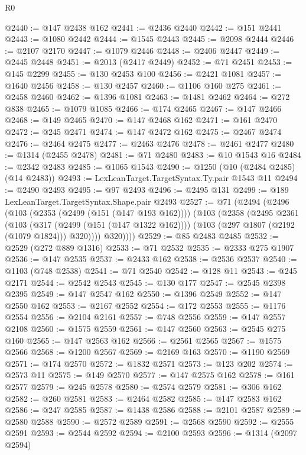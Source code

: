 \begin{lexlean}{R0}
\begin{coremodule}
@2440 := @147 @2438 @162
@2441 := @2436 @2440
@2442 := @151 @2441
@2443 := @1080 @2442
@2444 := @1545 @2443
@2445 := @2098 @2444
@2446 := @2107 @2170
@2447 := @1079 @2446
@2448 := @2406 @2447
@2449 := @2445 @2448
@2451 := @2013 (@2417 @2449)
@2452 := @71 @2451
@2453 := @145 @2299
@2455 := @130 @2453 @100
@2456 := @2421 @1081
@2457 := @1640 @2456
@2458 := @130 @2457
@2460 := @1106 @160 @275
@2461 := @2458 @2460
@2462 := @1396 @1081
@2463 := @1481 @2462
@2464 := @272 @838
@2465 := @1079 @1085
@2466 := @174 @2465
@2467 := @147 @2466
@2468 := @149 @2465
@2470 := @147 @2468 @162
@2471 := @161 @2470
@2472 := @245 @2471
@2474 := @147 @2472 @162
@2475 := @2467 @2474
@2476 := @2464 @2475
@2477 := @2463 @2476
@2478 := @2461 @2477
@2480 := @1314 (@2455 @2478)
@2481 := @71 @2480
@2483 := @10 @1543 @16
@2484 := @2342 @2483
@2485 := @1065 @1543
@2490 := @1250 (@10 (@2484 @2485) (@14 @2483))
@2493 := LexLeanTarget.TargetSyntax.Ty.pair @1543 @11
@2494 := @2490 @2493
@2495 := @97 @2493
@2496 := @2495 @131
@2499 := @189 LexLeanTarget.TargetSyntax.Shape.pair @2493
@2527 := @71
    (@2494
      (@2496
        (@103
          (@2353 (@2499 (@151 (@147 @193 @162))))
          (@103
            (@2358
              (@2495
                @2361
                (@103
                  (@317 (@2499 (@151 (@147 @1322 @162))))
                  (@103 (@297 @1807 (@2192 (@1079 @1824))) @320))))
            @320))))
@2529 := @85 @2483 @2485
@2532 := @2529 (@272 @889 @1316)
@2533 := @71 @2532
@2535 := @2333 @275 @1907
@2536 := @147 @2535
@2537 := @2433 @162
@2538 := @2536 @2537
@2540 := @1103 (@748 @2538)
@2541 := @71 @2540
@2542 := @128 @11
@2543 := @245 @2171
@2544 := @2542 @2543
@2545 := @130 @177
@2547 := @2545 @2398 @2395
@2549 := @147 @2547 @162
@2550 := @1396 @2549
@2552 := @147 @2550 @162
@2553 := @2167 @2552
@2554 := @172 @2553
@2555 := @1176 @2554
@2556 := @2104 @2161
@2557 := @748 @2556
@2559 := @147 @2557 @2108
@2560 := @1575 @2559
@2561 := @147 @2560
@2563 := @2545 @275 @160
@2565 := @147 @2563 @162
@2566 := @2561 @2565
@2567 := @1575 @2566
@2568 := @1200 @2567
@2569 := @2169 @163
@2570 := @1190 @2569
@2571 := @174 @2570
@2572 := @1832 @2571
@2573 := @123 @202
@2574 := @2573 @11
@2575 := @149 @2570
@2577 := @147 @2575 @162
@2578 := @161 @2577
@2579 := @245 @2578
@2580 := @2574 @2579
@2581 := @306 @162
@2582 := @260 @2581
@2583 := @2464 @2582
@2585 := @147 @2583 @162
@2586 := @247 @2585
@2587 := @1438 @2586
@2588 := @2101 @2587
@2589 := @2580 @2588
@2590 := @2572 @2589
@2591 := @2568 @2590
@2592 := @2555 @2591
@2593 := @2544 @2592
@2594 := @2100 @2593
@2596 := @1314 (@2097 @2594)

\end{coremodule}
\end{lexlean}
